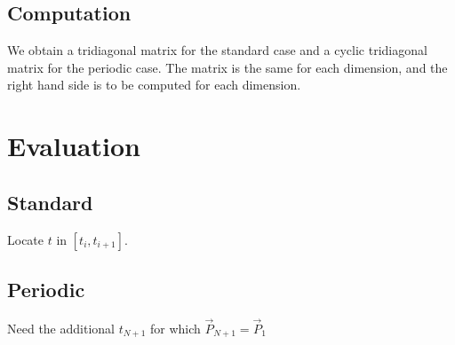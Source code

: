 \documentclass[aps,onecolumn]{revtex4}
\begin{document}
\subsection{Computation}
We obtain a tridiagonal matrix for the standard case and a cyclic tridiagonal matrix for the periodic case.
The matrix is the same for each dimension, and the right hand side is to be computed for each dimension.

\section{Evaluation}
\subsection{Standard}
Locate $t$ in $[t_i,t_{i+1}]$.

\subsection{Periodic}
Need the additional $t_{N+1}$ for which $\vec{P}_{N+1}=\vec{P}_1$
\end{document}
